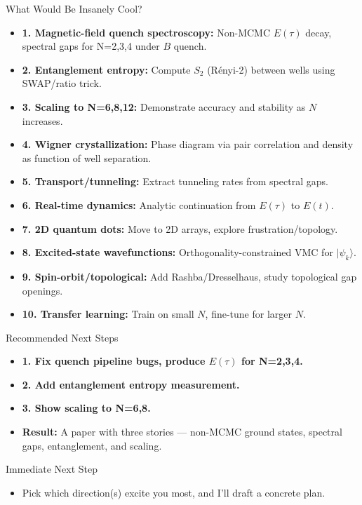 \documentclass{beamer}
\begin{document}
\begin{frame}{What Would Be Insanely Cool?}
\begin{itemize}
  \item \textbf{1. Magnetic-field quench spectroscopy:} Non-MCMC $E(\tau)$ decay, spectral gaps for N=2,3,4 under $B$ quench.
  \item \textbf{2. Entanglement entropy:} Compute $S_2$ (Rényi-2) between wells using SWAP/ratio trick.
  \item \textbf{3. Scaling to N=6,8,12:} Demonstrate accuracy and stability as $N$ increases.
  \item \textbf{4. Wigner crystallization:} Phase diagram via pair correlation and density as function of well separation.
  \item \textbf{5. Transport/tunneling:} Extract tunneling rates from spectral gaps.
  \item \textbf{6. Real-time dynamics:} Analytic continuation from $E(\tau)$ to $E(t)$.
  \item \textbf{7. 2D quantum dots:} Move to 2D arrays, explore frustration/topology.
  \item \textbf{8. Excited-state wavefunctions:} Orthogonality-constrained VMC for $|\psi_k\rangle$.
  \item \textbf{9. Spin-orbit/topological:} Add Rashba/Dresselhaus, study topological gap openings.
  \item \textbf{10. Transfer learning:} Train on small $N$, fine-tune for larger $N$.
\end{itemize}
\end{frame}

\begin{frame}{Recommended Next Steps}
\begin{itemize}
  \item \textbf{1. Fix quench pipeline bugs, produce $E(\tau)$ for N=2,3,4.}
  \item \textbf{2. Add entanglement entropy measurement.}
  \item \textbf{3. Show scaling to N=6,8.}
  \item \textbf{Result:} A paper with three stories — non-MCMC ground states, spectral gaps, entanglement, and scaling.
\end{itemize}
\end{frame}

\begin{frame}{Immediate Next Step}
\begin{itemize}
  \item Pick which direction(s) excite you most, and I'll draft a concrete plan.
\end{itemize}
\end{frame}
\end{document}
